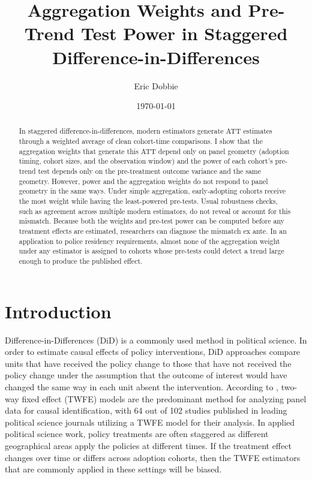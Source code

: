 \documentclass[12pt]{article}
\title{Aggregation Weights and Pre-Trend Test Power in Staggered Difference-in-Differences}
\author{Eric Dobbie}
\date{\today}
\begin{document}
\maketitle

\begin{abstract}
    \noindent In staggered difference-in-differences, modern estimators generate ATT estimates through a weighted average of clean cohort-time comparisons. I show that the aggregation weights that generate this ATT depend only on panel geometry (adoption timing, cohort sizes, and the observation window) and the power of each cohort's pre-trend test depends only on the pre-treatment outcome variance and the same geometry. However, power and the aggregation weights do not respond to panel geometry in the same ways. Under simple aggregation, early-adopting cohorts receive the most weight while having the least-powered pre-tests. Usual robustness checks, such as agreement across multiple modern estimators, do not reveal or account for this mismatch. Because both the weights and pre-test power can be computed before any treatment effects are estimated, researchers can diagnose the mismatch ex ante. In an application to police residency requirements, almost none of the aggregation weight under any estimator is assigned to cohorts whose pre-tests could detect a trend large enough to produce the published effect. 
\end{abstract}

\newpage

\section{Introduction}


Difference-in-Differences (DiD) is a commonly used method in political science. In order to estimate causal effects of policy interventions, DiD approaches compare units that have received the policy change to those that have not received the policy change under the assumption that the outcome of interest would have changed the same way in each unit absent the intervention. According to \textcite{chiu2026causal}, two-way fixed effect (TWFE) models are the predominant method for analyzing panel data for causal identification, with 64 out of 102 studies published in leading political science journals utilizing a TWFE model for their analysis. In applied political science work, policy treatments are often staggered as different geographical areas apply the policies at different times. If the treatment effect changes over time or differs across adoption cohorts, then the TWFE estimators that are commonly applied in these settings will be biased. 
\end{document}
